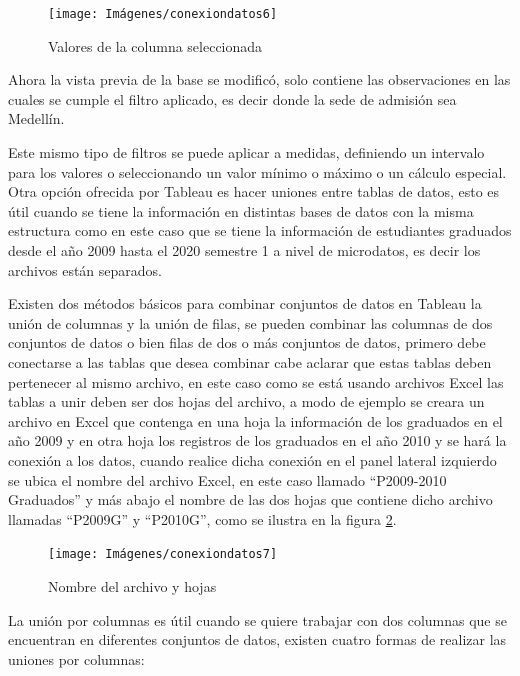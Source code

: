 \documentclass[
]{book}
\begin{document}
\begin{figure}

{\centering \texttt{[image: Imágenes/conexiondatos6]} 

}

\caption{Valores de la columna seleccionada}\label{fig:valoresdelcampo-fig}
\end{figure}

Ahora la vista previa de la base se modificó, solo contiene las observaciones en las cuales se cumple el filtro aplicado, es decir donde la sede de admisión sea Medellín.

Este mismo tipo de filtros se puede aplicar a medidas, definiendo un intervalo para los valores o seleccionando un valor mínimo o máximo o un cálculo especial.
Otra opción ofrecida por Tableau es hacer uniones entre tablas de datos, esto es útil cuando se tiene la información en distintas bases de datos con la misma estructura como en este caso que se tiene la información de estudiantes graduados desde el año 2009 hasta el 2020 semestre 1 a nivel de microdatos, es decir los archivos están separados.

Existen dos métodos básicos para combinar conjuntos de datos en Tableau la unión de columnas y la unión de filas, se pueden combinar las columnas de dos conjuntos de datos o bien filas de dos o más conjuntos de datos, primero debe conectarse a las tablas que desea combinar cabe aclarar que estas tablas deben pertenecer al mismo archivo, en este caso como se está usando archivos Excel las tablas a unir deben ser dos hojas del archivo, a modo de ejemplo se creara un archivo en Excel que contenga en una hoja la información de los graduados en el año 2009 y en otra hoja los registros de los graduados en el año 2010 y se hará la conexión a los datos, cuando realice dicha conexión en el panel lateral izquierdo se ubica el nombre del archivo Excel, en este caso llamado ``P2009-2010 Graduados'' y más abajo el nombre de las dos hojas que contiene dicho archivo llamadas ``P2009G'' y ``P2010G'', como se ilustra en la figura \ref{fig:hojas-fig}.

\begin{figure}

{\centering \texttt{[image: Imágenes/conexiondatos7]} 

}

\caption{Nombre del archivo y hojas}\label{fig:hojas-fig}
\end{figure}

La unión por columnas es útil cuando se quiere trabajar con dos columnas que se encuentran en diferentes conjuntos de datos, existen cuatro formas de realizar las uniones por columnas:
\end{document}
